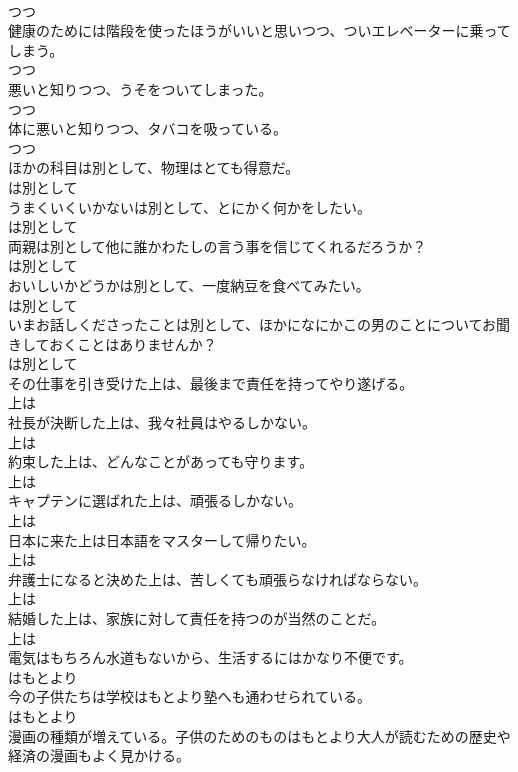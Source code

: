 \documentclass[8pt]{extreport}
\begin{document}
\begin{CJK}{UTF8}{min}
\\	つつ
\\	健康のためには階段を使ったほうがいいと思いつつ、ついエレベーターに乗ってしまう。	
\\	つつ
\\	悪いと知りつつ、うそをついてしまった。	
\\	つつ
\\	体に悪いと知りつつ、タバコを吸っている。	
\\	つつ
\\	ほかの科目は別として、物理はとても得意だ。	
\\	は別として
\\	うまくいくいかないは別として、とにかく何かをしたい。	
\\	は別として
\\	両親は別として他に誰かわたしの言う事を信じてくれるだろうか？	
\\	は別として
\\	おいしいかどうかは別として、一度納豆を食べてみたい。	
\\	は別として
\\	いまお話しくださったことは別として、ほかになにかこの男のことについてお聞きしておくことはありませんか？	
\\	は別として
\\	その仕事を引き受けた上は、最後まで責任を持ってやり遂げる。	
\\	上は
\\	社長が決断した上は、我々社員はやるしかない。	
\\	上は
\\	約束した上は、どんなことがあっても守ります。	
\\	上は
\\	キャプテンに選ばれた上は、頑張るしかない。	
\\	上は
\\	日本に来た上は日本語をマスターして帰りたい。	
\\	上は
\\	弁護士になると決めた上は、苦しくても頑張らなければならない。	
\\	上は
\\	結婚した上は、家族に対して責任を持つのが当然のことだ。	
\\	上は
\\	電気はもちろん水道もないから、生活するにはかなり不便です。	
\\	はもとより
\\	今の子供たちは学校はもとより塾へも通わせられている。	
\\	はもとより
\\	漫画の種類が増えている。子供のためのものはもとより大人が読むための歴史や経済の漫画もよく見かける。	

\end{CJK}
\end{document}
